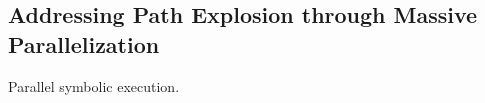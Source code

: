 \subsection{Addressing Path Explosion through Massive Parallelization}




Parallel symbolic execution.

